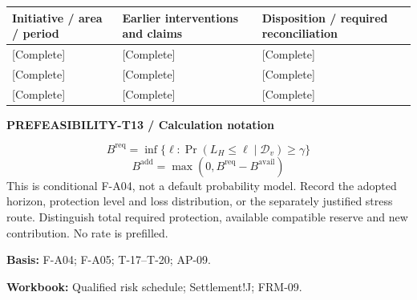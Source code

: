 {\sffamily\fontsize{8.3}{10.3}\selectfont\begin{longtable}{@{}P{51.14mm} P{56.09mm} P{57.74mm}@{}}
\toprule
\textbf{Initiative / area / period} & \textbf{Earlier interventions and claims} & \textbf{Disposition / required reconciliation}\\\midrule\endhead
\rule{0pt}{7.7mm}[Complete] & [Complete] & [Complete]\\\hline
\rule{0pt}{7.7mm}[Complete] & [Complete] & [Complete]\\\hline
\rule{0pt}{7.7mm}[Complete] & [Complete] & [Complete]\\\hline
\end{longtable}}
\par\begingroup\sffamily\fontsize{8}{10}\selectfont\color{NEBGreen}\setlength{\parskip}{2pt}\setlength{\abovedisplayskip}{4pt}\setlength{\belowdisplayskip}{4pt}\setlength{\abovedisplayshortskip}{2pt}\setlength{\belowdisplayshortskip}{3pt}
\textbf{PREFEASIBILITY-T13 / Calculation notation}\par
{\fontsize{9}{11}\selectfont\[ B^{\mathrm{req}}=\inf\{\ell:\Pr(L_H\le\ell\mid\mathcal D_v)\ge\gamma\} \]}
{\fontsize{9}{11}\selectfont\[ B^{\mathrm{add}}=\max(0,B^{\mathrm{req}}-B^{\mathrm{avail}}) \]}
This is conditional F-A04, not a default probability model. Record the adopted horizon, protection level and loss distribution, or the separately justified stress route. Distinguish total required protection, available compatible reserve and new contribution. No rate is prefilled.\par
\textbf{Basis:} F-A04; F-A05; T-17–T-20; AP-09.\par
\textbf{Workbook:} Qualified risk schedule; Settlement!J; FRM-09.\par\endgroup
